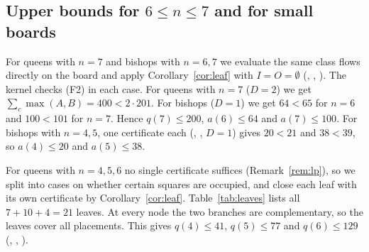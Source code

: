 \documentclass[11pt]{amsart}
\theoremstyle{plain}
\theoremstyle{definition}
\begin{document}
\subsection{Upper bounds for \texorpdfstring{$6\le n\le7$}{6 <= n <= 7} and for small boards}\label{sec:small}
For queens with $n=7$ and bishops with $n=6,7$ we evaluate the same class flows directly on the board and apply Corollary~\ref{cor:leaf} with $I=O=\emptyset$ (, , ). The kernel checks (F2) in each case. For queens with $n=7$ ($D=2$) we get $\sum_c\max(A,B)=400<2\cdot201$. For bishops ($D=1$) we get $64<65$ for $n=6$ and $100<101$ for $n=7$. Hence $q(7)\le200$, $a(6)\le64$ and $a(7)\le100$. For bishops with $n=4,5$, one certificate each (, , $D=1$) gives $20<21$ and $38<39$, so $a(4)\le20$ and $a(5)\le38$.

For queens with $n=4,5,6$ no single certificate suffices (Remark~\ref{rem:lp}), so we split into cases on whether certain squares are occupied, and close each leaf with its own certificate by Corollary~\ref{cor:leaf}. Table~\ref{tab:leaves} lists all $7+10+4=21$ leaves. At every node the two branches are complementary, so the leaves cover all placements. This gives $q(4)\le41$, $q(5)\le77$ and $q(6)\le129$ (, , ).
\end{document}
